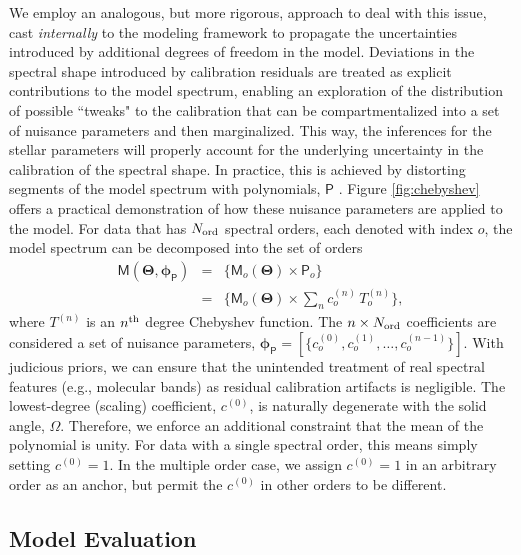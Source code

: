 \documentclass[iop,floatfix,numberedappendix,twocolappendix]{emulateapj}
\newcommand{\vM}{\mathsf{M}}
\newcommand{\vT}{ {\bm \Theta}}
\newcommand{\vp}{ {\bm \phi}}
\newcommand{\cheb}{ \vp_{\mathsf{P}}}
\begin{document}
We employ an analogous, but more rigorous, approach to deal with this issue, cast {\it internally}
to the modeling framework to propagate the uncertainties introduced by additional degrees of freedom
in the model.  Deviations in the spectral shape introduced by calibration residuals are treated as
explicit contributions to the model spectrum, enabling an exploration of the distribution of
possible ``tweaks" to the calibration that can be compartmentalized into a set of nuisance
parameters and then marginalized.  This way, the inferences for the stellar parameters will properly
account for the underlying uncertainty in the calibration of the spectral shape.  In practice, this
is achieved by distorting segments of the model spectrum with polynomials, $\mathsf{P}$
\citep[e.g.,][]{eisenstein06,koleva09}. Figure \ref{fig:chebyshev} offers a practical demonstration
of how these nuisance parameters are applied to the model. For data that has $N_{\rm ord}$ spectral
orders, each denoted with index $o$, the model spectrum can be decomposed into the set of orders
\begin{eqnarray} \label{eqn:chebyshev}
\vM(\vT, \cheb) &=& \{ \vM_o(\vT) \times \mathsf{P}_o \} \\
                &=& \{ \vM_o(\vT) \times \sum_n c_o^{(n)} \, T_o^{(n)} \}, \nonumber
\end{eqnarray}
where $T^{(n)}$ is an $n^{\rm th}$ degree Chebyshev function.  The $n \times N_{\rm ord}$ 
coefficients are considered a set of nuisance parameters, $\cheb = [\{c_o^{(0)}, c_o^{(1)}, 
\ldots, c_o^{(n-1)} \}]$.  With judicious priors, we can ensure that the unintended treatment of 
real spectral features (e.g., molecular bands) as residual calibration artifacts is negligible.  
The lowest-degree (scaling) coefficient, $c^{(0)}$, is naturally degenerate with the solid angle, 
$\Omega$.  Therefore, we enforce an additional constraint that the mean of the polynomial is 
unity.  For data with a single spectral order, this means simply setting $c^{(0)} = 1$.  In the 
multiple order case, we assign $c^{(0)} = 1$ in an arbitrary order as an anchor, but permit the 
$c^{(0)}$ in other orders to be different.   


\subsection{Model Evaluation} \label{subsec:likelihood}
\end{document}
